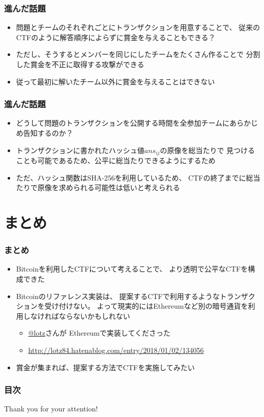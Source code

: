 \begin{frame}
  \frametitle{進んだ話題}

  \begin{itemize}
    \item<+-> 問題とチームのそれぞれごとにトランザクションを用意することで、
    従来のCTFのように解答順序によらずに賞金を与えることもできる？

    \item<+-> ただし、そうするとメンバーを同じにしたチームをたくさん作ることで
    分割した賞金を不正に取得する攻撃ができる

    \item<+-> 従って最初に解いたチーム以外に賞金を与えることはできない
  \end{itemize}
\end{frame}

\begin{frame}
  \frametitle{進んだ話題}

  \begin{itemize}
    \item<+-> どうして問題のトランザクションを公開する時間を全参加チームにあらかじめ告知するのか？

    \item<+-> トランザクションに書かれたハッシュ値$ans_{ij}$の原像を総当たりで
    見つけることも可能であるため、公平に総当たりできるようにするため

    \item<+-> ただ、ハッシュ関数はSHA-256を利用しているため、
    CTFの終了までに総当たりで原像を求められる可能性は低いと考えられる
  \end{itemize}
\end{frame}

\section{まとめ}

\begin{frame}
  \frametitle{まとめ}

  \pause
  \begin{itemize}
    \item<+-> Bitcoinを利用したCTFについて考えることで、
    より透明で公平なCTFを構成できた

    \item<+-> Bitcoinのリファレンス実装は、
    提案するCTFで利用するようなトランザクションを受け付けない。
    よって現実的にはEthereumなど別の暗号通貨を利用しなければならないかもしれない
    \begin{itemize}
      \item<+-> \href{https://twitter.com/lotz84_}{@lotz}さんが
      Ethereumで実装してくださった
      \item<+-> {\footnotesize \url{http://lotz84.hatenablog.com/entry/2018/01/02/134056}}
    \end{itemize}

    \item<+-> 賞金が集まれば、提案する方法でCTFを実施してみたい
  \end{itemize}
\end{frame}

\begin{frame}
  \frametitle{目次}

  \tableofcontents
\end{frame}

\begin{frame}
  \centering
  {\Huge Thank you for your attention!}
\end{frame}



